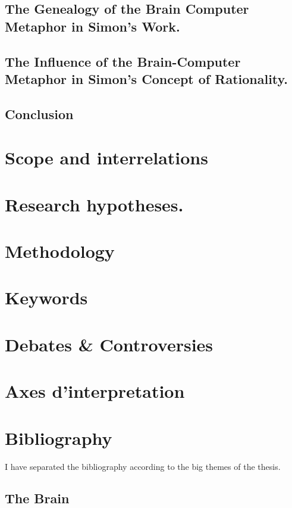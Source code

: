 \documentclass[paper=B6,portrait,twoside=true,twocolumn=false,headinclude=true,footinclude=false,fontsize=12,BCOR=10mm,DIV=calc,pagesize=auto,titlepage=firstiscover,mpinclude=false,headings=normal,headings=twolinechapter,open=right,toc=graduated,chapterprefix=false,numbers=endperiod,parskip=half+]{scrbook}
\theoremstyle{definition}
\begin{document}
\subsection{The Genealogy of the Brain Computer Metaphor in Simon's Work.}
\label{sec:orgc1abbd5}
\subsection{The Influence of the Brain-Computer Metaphor in Simon's Concept of Rationality.}
\label{sec:org32e1228}
\subsection{Conclusion}
\label{sec:org02a3724}
\section{Scope and interrelations}
\label{sec:org6505528}
\lipsum
\section{Research hypotheses.}
\label{sec:org29387f1}
\lipsum
\section{Methodology}
\label{sec:orgbed2251}
\lipsum
\section{Keywords}
\label{sec:orgcb3d39e}
\lipsum
\section{Debates \& Controversies}
\label{sec:org4193f88}
\lipsum
\section{Axes d'interpretation}
\label{sec:org1028d47}
\lipsum
\section{Bibliography}
\label{sec:org19416e4}
I have separated the bibliography according to the big themes of the
thesis. 

\nocite{*}
\subsection{The Brain}
\label{sec:org88d5a16}
\printbibliography[heading=none,keyword=memoire,keyword=brain]
\end{document}
